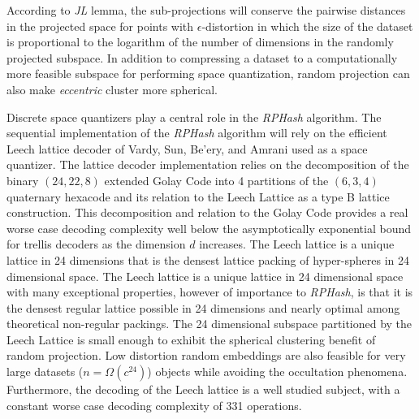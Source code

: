 \documentclass[a4paper,10pt]{article}
\begin{document}
According to
\emph{JL} lemma, the sub-projections will conserve the pairwise distances
in the projected space for points with $\epsilon$-distortion in which
the size of the dataset is proportional to the logarithm of the number of
dimensions in the randomly projected subspace.	In addition to compressing
a dataset to a computationally more feasible subspace for performing space
quantization, random projection can also make \emph{eccentric} cluster more
spherical\cite{Dasgupta2000,vempala}.

Discrete space quantizers play a central role in the \emph{RPHash} algorithm.
The sequential implementation of the \emph{RPHash} algorithm will rely on the 
efficient Leech lattice decoder of Vardy, Sun, Be'ery, and Amrani
\cite{Vardy95,Sun,Be'ery,Amrani} used as a space quantizer.  The lattice
decoder implementation relies on the decomposition of the binary $(24,22,8)$
extended Golay Code into 4 partitions of the $(6,3,4)$ quaternary hexacode
and its relation to the Leech Lattice as a type B lattice construction.
This decomposition and relation to the Golay Code provides a real worse
case decoding complexity well below the asymptotically exponential bound
for trellis decoders as the dimension $d$ increases\cite{Tarokh1,Tarokh2}.
The Leech lattice is a unique lattice in 24 dimensions that is the densest
lattice packing of hyper-spheres in 24 dimensional space\cite{leech,SPLAG}.
The Leech lattice is a unique lattice in 24 dimensional space with many
exceptional properties, however of importance to \emph{RPHash}, is that it
is the densest regular lattice possible in 24 dimensions and nearly optimal
among theoretical non-regular packings\cite{Cohn}.  The 24 dimensional
subspace partitioned by the Leech Lattice is small enough to exhibit the
spherical clustering benefit of random projection.  Low distortion random
embeddings are also feasible for very large datasets ($n = \Omega(c^{24})$)
objects while avoiding the occultation phenomena\cite{Urruty2007}.
Furthermore, the decoding of the Leech lattice is a well studied subject,
with a constant worse case decoding complexity of 331 operations\cite{Vardy95}.
\end{document}
